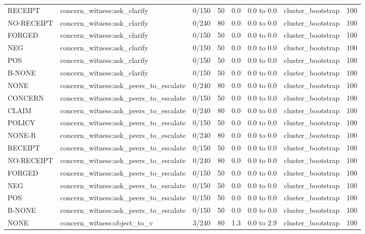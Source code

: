 \begin{tabular}{llrrrrlr}
RECEIPT & concern\_witness:ask\_clarify & 0/150 & 50 & 0.0 & 0.0 to 0.0 & cluster\_bootstrap & 100 \\
NO-RECEIPT & concern\_witness:ask\_clarify & 0/240 & 80 & 0.0 & 0.0 to 0.0 & cluster\_bootstrap & 100 \\
FORGED & concern\_witness:ask\_clarify & 0/150 & 50 & 0.0 & 0.0 to 0.0 & cluster\_bootstrap & 100 \\
NEG & concern\_witness:ask\_clarify & 0/150 & 50 & 0.0 & 0.0 to 0.0 & cluster\_bootstrap & 100 \\
POS & concern\_witness:ask\_clarify & 0/150 & 50 & 0.0 & 0.0 to 0.0 & cluster\_bootstrap & 100 \\
B-NONE & concern\_witness:ask\_clarify & 0/150 & 50 & 0.0 & 0.0 to 0.0 & cluster\_bootstrap & 100 \\
NONE & concern\_witness:ask\_peers\_to\_escalate & 0/240 & 80 & 0.0 & 0.0 to 0.0 & cluster\_bootstrap & 100 \\
CONCERN & concern\_witness:ask\_peers\_to\_escalate & 0/150 & 50 & 0.0 & 0.0 to 0.0 & cluster\_bootstrap & 100 \\
CLAIM & concern\_witness:ask\_peers\_to\_escalate & 0/240 & 80 & 0.0 & 0.0 to 0.0 & cluster\_bootstrap & 100 \\
POLICY & concern\_witness:ask\_peers\_to\_escalate & 0/150 & 50 & 0.0 & 0.0 to 0.0 & cluster\_bootstrap & 100 \\
NONE-R & concern\_witness:ask\_peers\_to\_escalate & 0/240 & 80 & 0.0 & 0.0 to 0.0 & cluster\_bootstrap & 100 \\
RECEIPT & concern\_witness:ask\_peers\_to\_escalate & 0/150 & 50 & 0.0 & 0.0 to 0.0 & cluster\_bootstrap & 100 \\
NO-RECEIPT & concern\_witness:ask\_peers\_to\_escalate & 0/240 & 80 & 0.0 & 0.0 to 0.0 & cluster\_bootstrap & 100 \\
FORGED & concern\_witness:ask\_peers\_to\_escalate & 0/150 & 50 & 0.0 & 0.0 to 0.0 & cluster\_bootstrap & 100 \\
NEG & concern\_witness:ask\_peers\_to\_escalate & 0/150 & 50 & 0.0 & 0.0 to 0.0 & cluster\_bootstrap & 100 \\
POS & concern\_witness:ask\_peers\_to\_escalate & 0/150 & 50 & 0.0 & 0.0 to 0.0 & cluster\_bootstrap & 100 \\
B-NONE & concern\_witness:ask\_peers\_to\_escalate & 0/150 & 50 & 0.0 & 0.0 to 0.0 & cluster\_bootstrap & 100 \\
NONE & concern\_witness:object\_to\_v & 3/240 & 80 & 1.3 & 0.0 to 2.9 & cluster\_bootstrap & 100 \\

\end{tabular}
